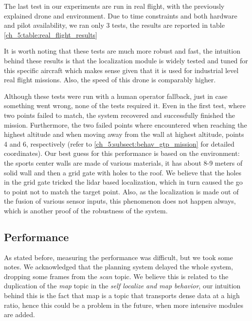   The last test in our experiments are run in real flight, with the previously explained drone and environment. Due to time constraints and both hardware and pilot availability, we ran only 3 tests, the results are reported in table \ref{ch_5:table:real_flight_results}

  

  It is worth noting that these tests are much more robust and fast, the intuition behind these results is that the localization module is widely tested and tuned for this specific aircraft which makes sense given that it is used for industrial level real flight missions. Also, the speed of this drone is comparably higher.

  Although these tests were run with a human operator fallback, just in case something went wrong, none of the tests required it. Even in the first test, where two points failed to match, the system recovered and successfully finished the mission. Furthermore, the two failed points where encountered when reaching the highest altitude and when moving away from the wall at highest altitude, points 4 and 6, respectively (refer to \ref{ch_5:subsect:behav_gtp_mission} for detailed coordinates). Our best guess for this performance is based on the environment: the sports center walls are made of various materials, it has about 8-9 meters of solid wall and then a grid gate with holes to the roof. We believe that the holes in the grid gate tricked the lidar based localization, which in turn caused the go to point not to match the target point. Also, as the localization is made out of the fusion of various sensor inputs, this phenomenon does not happen always, which is another proof of the robustness of the system.

  \subsection{Performance}

  As stated before, measuring the performance was difficult, but we took some notes. We acknowledged that the planning system delayed the whole system, dropping some frames from the \textit{scan} topic. We believe this is related to the duplication of the \textit{map} topic in the \textit{self localize and map behavior}, our intuition behind this is the fact that map is a topic that transports dense data at a high ratio, hence this could be a problem in the future, when more intensive modules are added.

